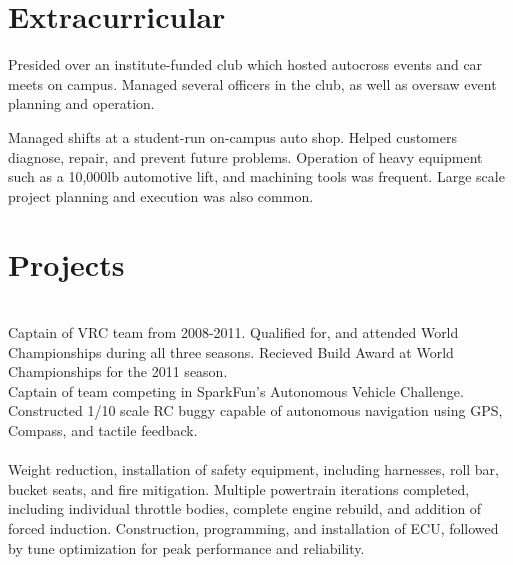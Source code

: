 \documentclass[letterpaper]{deedy-resume} %
\begin{document}
\begin{minipage}[t]{0.66\textwidth}

\section{Extracurricular} 

Presided over an institute-funded club which hosted autocross events and car meets
on campus. Managed several officers in the club, as well as oversaw event planning
and operation.
\vspace{3pt}\\


Managed shifts at a student-run on-campus auto shop. Helped customers diagnose,
repair, and prevent future problems. Operation of heavy equipment such as a
10,000lb automotive lift, and machining tools was frequent. Large scale project
planning and execution was also common.


\section{Projects}
~\\
 Captain of VRC team from 2008-2011. Qualified for, and attended World Championships during all three seasons. Recieved Build Award at World Championships for the 2011 season.\\
Captain of team competing in SparkFun’s Autonomous Vehicle Challenge. Constructed 1/10 scale RC buggy capable of autonomous navigation using GPS, Compass, and tactile feedback.\vspace{5pt}\\
~\\
 Weight reduction, installation of safety equipment, including harnesses, roll bar, bucket seats, and fire mitigation. Multiple powertrain iterations completed, including individual throttle bodies, complete engine rebuild, and addition of forced induction. Construction, programming, and installation of ECU, followed by tune optimization for peak performance and reliability.


\end{minipage} %
\end{document}
